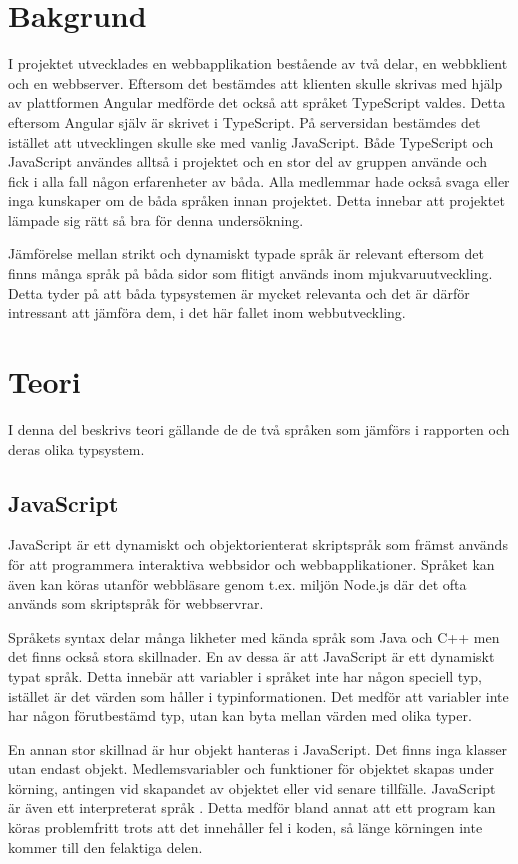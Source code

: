 \section{Bakgrund}
I projektet utvecklades en webbapplikation bestående av två delar, en webbklient och en webbserver. Eftersom det bestämdes att klienten skulle skrivas med hjälp av plattformen Angular medförde det också att språket TypeScript valdes. Detta eftersom Angular själv är skrivet i TypeScript. På serversidan bestämdes det istället att utvecklingen skulle ske med vanlig JavaScript. Både TypeScript och JavaScript användes alltså i projektet och en stor del av gruppen använde och fick i alla fall någon erfarenheter av båda. Alla medlemmar hade också svaga eller inga kunskaper om de båda språken innan projektet. Detta innebar att projektet lämpade sig rätt så bra för denna undersökning.

Jämförelse mellan strikt och dynamiskt typade språk är relevant eftersom det finns många språk på båda sidor som flitigt används inom mjukvaruutveckling. Detta tyder på att båda typsystemen är mycket relevanta och det är därför intressant att jämföra dem, i det här fallet inom webbutveckling.
\section{Teori}
I denna del beskrivs teori gällande de de två språken som jämförs i rapporten och deras olika typsystem.
\subsection{JavaScript}
JavaScript är ett dynamiskt och objektorienterat skriptspråk som främst används för att programmera interaktiva webbsidor och webbapplikationer. Språket kan även kan köras utanför webbläsare genom t.ex. miljön Node.js där det ofta används som skriptspråk för webbservrar. \cite{henrik_js1}

Språkets syntax delar många likheter med kända språk som Java och C++ men det finns också stora skillnader. En av dessa är att JavaScript är ett dynamiskt typat språk. Detta innebär att variabler i språket inte har någon speciell typ, istället är det värden som håller i typinformationen. Det medför att variabler inte har någon förutbestämd typ, utan kan byta mellan värden med olika typer. \cite{henrik_js2}

En annan stor skillnad är hur objekt hanteras i JavaScript. Det finns inga klasser utan endast objekt. Medlemsvariabler och funktioner för objektet skapas under körning, antingen vid skapandet av objektet eller vid senare tillfälle. \cite{henrik_js3}
JavaScript är även ett interpreterat språk \cite{henrik_js1}. Detta medför bland annat att ett program kan köras problemfritt trots att det innehåller fel i koden, så länge körningen inte kommer till den felaktiga delen.
